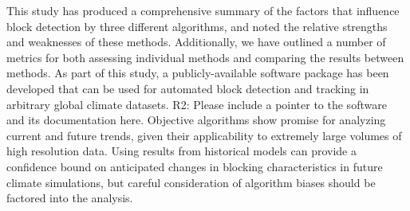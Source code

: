 \documentclass[smallextended]{svjour3}       %
\numberwithin{equation}{section}
\begin{document}
This study has produced a comprehensive summary of the factors that influence block detection by three different algorithms, and noted the relative strengths and weaknesses of these methods.  Additionally, we have outlined a number of metrics for both assessing individual methods and comparing the results between methods. As part of this study, a publicly-available software package has been developed that can be used for automated block detection and tracking in arbitrary global climate datasets.
{\color{teal}R2: Please include a pointer to the software and its documentation here.}
Objective algorithms show promise for analyzing current and future trends, given their applicability to extremely large volumes of high resolution data. Using results from historical models can provide a confidence bound on anticipated changes in blocking characteristics in future climate simulations, but careful consideration of algorithm biases should be factored into the analysis.



\end{document}
